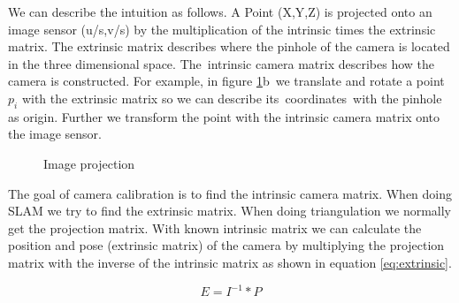 \documentclass[11pt,a4paper,titlepage,oneside]{report}
\begin{document}
We can describe the intuition as follows. A Point (X,Y,Z) is projected onto an image sensor (u/s,v/s) by the multiplication of the intrinsic times the extrinsic matrix. The extrinsic matrix describes where the pinhole of the camera is located in the three dimensional space. The intrinsic camera matrix describes how the camera is constructed. For example, in figure \ref{fig:projection}b we translate and rotate a point $p_i$ with the extrinsic matrix so we can describe its coordinates with the pinhole as origin. Further we transform the point with the intrinsic camera matrix onto the image sensor.

\begin{figure}[H]
	\centering
	\caption{Image projection}\label{fig:projection}
\end{figure}

The goal of camera calibration is to find the intrinsic camera matrix. When doing SLAM we try to find the extrinsic matrix. When doing triangulation we normally get the projection matrix. With known intrinsic matrix we can calculate the position and pose (extrinsic matrix) of the camera by multiplying the projection matrix with the inverse of the intrinsic matrix as shown in equation \ref{eq:extrinsic}. 

\begin{equation}\label{eq:extrinsic}
	E=I^{-1}*P
\end{equation}
\end{document}
